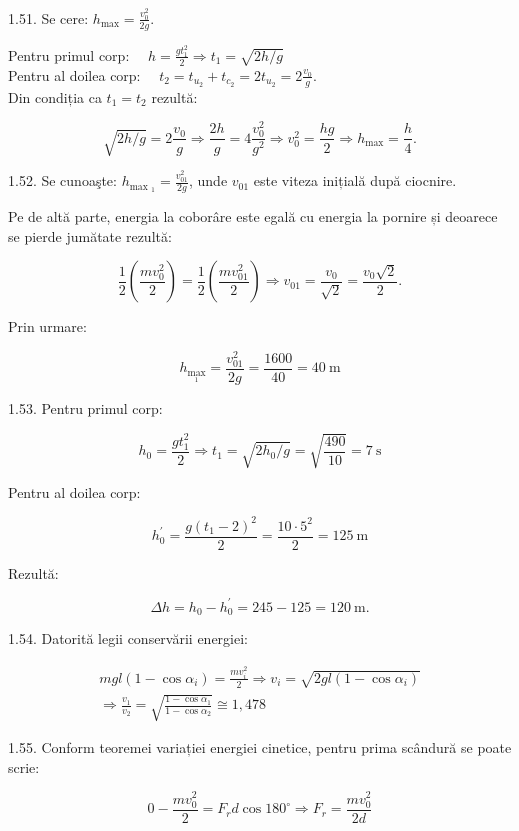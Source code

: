 1.51. Se cere: $h_{\max }=\frac{v_{0}^{2}}{2 g}$.

Pentru primul corp: $\quad h=\frac{g t_{1}^{2}}{2} \Rightarrow t_{1}=\sqrt{2 h / g}$\\
Pentru al doilea corp: $\quad t_{2}=t_{u_{2}}+t_{c_{2}}=2 t_{u_{2}}=2 \frac{v_{0}}{g}$.\\
Din condiția ca $t_{1}=t_{2}$ rezultă:

$$
\sqrt{2 h / g}=2 \frac{v_{0}}{g} \Rightarrow \frac{2 h}{g}=4 \frac{v_{0}^{2}}{g^{2}} \Rightarrow v_{0}^{2}=\frac{h g}{2} \Rightarrow h_{\max }=\frac{h}{4} .
$$

1.52. Se cunoaşte: $h_{\text {max }_{1}}=\frac{v_{01}^{2}}{2 g}$, unde $v_{01}$ este viteza inițială după ciocnire.

Pe de altă parte, energia la coborâre este egală cu energia la pornire și deoarece se pierde jumătate rezultă:

$$
\frac{1}{2}\left(\frac{m v_{0}^{2}}{2}\right)=\frac{1}{2}\left(\frac{m v_{01}^{2}}{2}\right) \Rightarrow v_{01}=\frac{v_{0}}{\sqrt{2}}=\frac{v_{0} \sqrt{2}}{2} .
$$

Prin urmare:

$$
h_{\max _{1}}=\frac{v_{01}^{2}}{2 g}=\frac{1600}{40}=40 \mathrm{~m}
$$

1.53. Pentru primul corp:

$$
h_{0}=\frac{g t_{1}^{2}}{2} \Rightarrow t_{1}=\sqrt{2 h_{0} / g}=\sqrt{\frac{490}{10}}=7 \mathrm{~s}
$$

Pentru al doilea corp:

$$
h_{0}^{\prime}=\frac{g\left(t_{1}-2\right)^{2}}{2}=\frac{10 \cdot 5^{2}}{2}=125 \mathrm{~m}
$$

Rezultă:

$$
\Delta h=h_{0}-h_{0}^{\prime}=245-125=120 \mathrm{~m} .
$$

1.54. Datorită legii conservării energiei:

$$
\begin{gathered}
m g l\left(1-\cos \alpha_{i}\right)=\frac{m v_{i}^{2}}{2} \Rightarrow v_{i}=\sqrt{2 g l\left(1-\cos \alpha_{i}\right)} \\
\Rightarrow \frac{v_{1}}{v_{2}}=\sqrt{\frac{1-\cos \alpha_{1}}{1-\cos \alpha_{2}}} \cong 1,478
\end{gathered}
$$

1.55. Conform teoremei variației energiei cinetice, pentru prima scândură se poate scrie:

$$
0-\frac{m v_{0}^{2}}{2}=F_{r} d \cos 180^{\circ} \Rightarrow F_{r}=\frac{m v_{0}^{2}}{2 d}
$$

